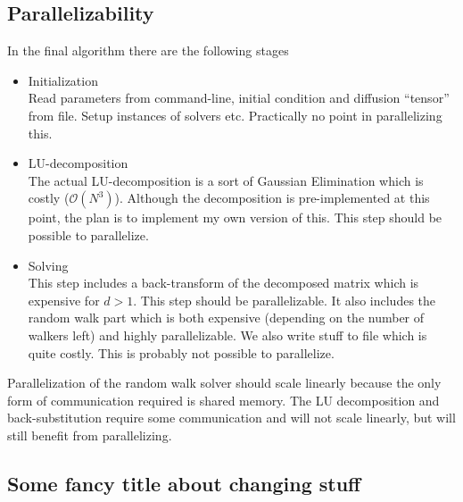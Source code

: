 \subsection{Parallelizability}
In the final algorithm there are the following stages
\begin{itemize}
 \item Initialization\\
 Read parameters from command-line, initial condition and diffusion ``tensor'' from file. Setup instances of solvers etc. Practically no point in parallelizing this.
 \item LU-decomposition\\
 The actual LU-decomposition is a sort of Gaussian Elimination which is costly ($\mathcal{O}(N^3)$). Although the decomposition is pre-implemented at this point, the plan is to implement my own version of this. This step should be possible to parallelize.
 \item Solving\\
 This step includes a back-transform of the decomposed matrix which is expensive for $d>1$. This step should be parallelizable. It also includes the random walk part which is both expensive (depending on the number of walkers left) and highly parallelizable. We also write stuff to file which is quite costly. This is probably not possible to parallelize.
\end{itemize}

Parallelization of the random walk solver should scale linearly because the only form of communication required is shared memory. 
The LU decomposition and back-substitution require some communication and will not scale linearly, but will still benefit from parallelizing. 

\subsection{Some fancy title about changing stuff}

